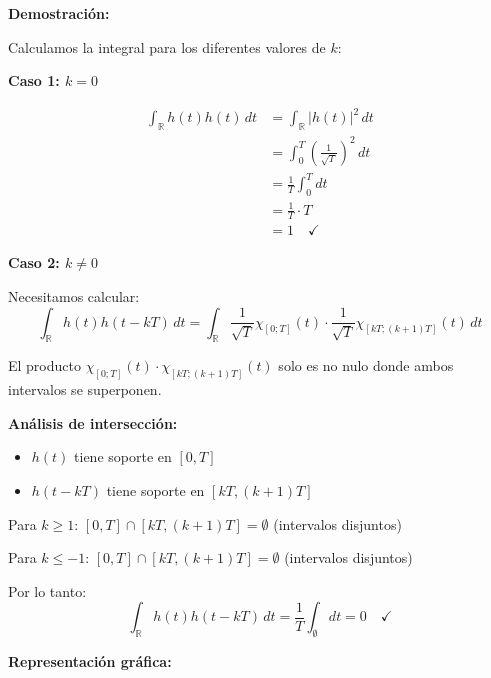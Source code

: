 \documentclass[11pt,a4paper]{article}
\begin{document}
\textbf{Demostraci\'on:}

Calculamos la integral para los diferentes valores de $k$:

\textbf{Caso 1: $k = 0$}

\begin{align*}
\int_{\mathbb{R}} h(t) h(t)\, dt &= \int_{\mathbb{R}} |h(t)|^2\, dt \\
&= \int_0^T \left(\frac{1}{\sqrt{T}}\right)^2\, dt \\
&= \frac{1}{T} \int_0^T dt \\
&= \frac{1}{T} \cdot T \\
&= 1 \quad ✓
\end{align*}

\textbf{Caso 2: $k \neq 0$}

Necesitamos calcular:
\[
\int_{\mathbb{R}} h(t) h(t - kT)\, dt = \int_{\mathbb{R}} \frac{1}{\sqrt{T}}\chi_{[0;T]}(t) \cdot \frac{1}{\sqrt{T}}\chi_{[kT;(k+1)T]}(t)\, dt
\]

El producto $\chi_{[0;T]}(t) \cdot \chi_{[kT;(k+1)T]}(t)$ solo es no nulo donde ambos intervalos se superponen.

\textbf{An\'alisis de intersecci\'on:}
\begin{itemize}
    \item $h(t)$ tiene soporte en $[0, T]$
    \item $h(t - kT)$ tiene soporte en $[kT, (k+1)T]$
\end{itemize}

Para $k \geq 1$: $[0, T] \cap [kT, (k+1)T] = \emptyset$ (intervalos disjuntos)

Para $k \leq -1$: $[0, T] \cap [kT, (k+1)T] = \emptyset$ (intervalos disjuntos)

Por lo tanto:
\[
\int_{\mathbb{R}} h(t) h(t - kT)\, dt = \frac{1}{T} \int_{\emptyset} dt = 0 \quad ✓
\]

\textbf{Representaci\'on gr\'afica:}

\begin{center}
\end{center}
\end{document}
